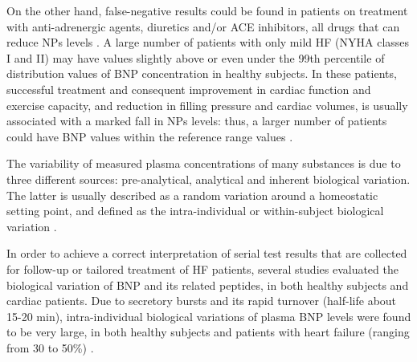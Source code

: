 \documentclass[14pt,a4paper,onecolumn]{extarticle}
\begin{document}
On the other hand, false-negative results could be found in patients on treatment with anti-adrenergic agents, diuretics and/or ACE inhibitors, all drugs that can reduce NPs levels \citep{bib35}.  A large number of patients with only mild HF (NYHA classes I and II) may have values slightly above or even under the 99th percentile of distribution values of BNP concentration in healthy subjects. In these patients, successful treatment and consequent improvement in cardiac function and exercise capacity, and reduction in filling pressure and cardiac volumes, is usually associated with a marked fall in NPs levels: thus, a larger number of patients could have BNP values within the reference range values \citep{bib35} \citep{bib390}. %

The variability of measured plasma concentrations of many substances is due to three different sources: pre-analytical, analytical and inherent biological variation. The latter is usually described as a random variation around a homeostatic setting point, and defined as the intra-individual or within-subject biological variation \citep{bib395}.


In order to achieve a correct interpretation of serial test results that are collected for follow-up or tailored treatment of HF patients, several studies evaluated the biological variation of BNP and its related peptides, in both healthy subjects and cardiac patients. Due to secretory bursts and its rapid turnover (half-life about 15-20 min), intra-individual biological variations of plasma BNP levels were found to be very large, in both healthy subjects and patients with heart failure (ranging from 30 to 50\%) \citep{bib399}.  %
\end{document}
